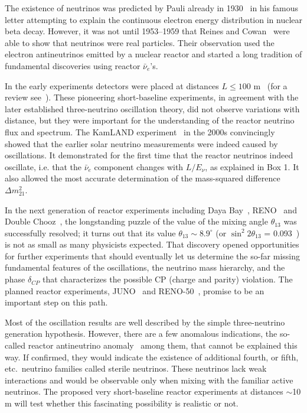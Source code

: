 \documentclass[aps,twocolumn,preprintnumbers,amsmath,superscriptaddress,amssymb,floats,nofootinbib]{revtex4-1}
\begin{document}
The existence of neutrinos was predicted by Pauli already in 1930~\cite{Pauli30} in his famous letter attempting to explain the continuous electron energy 
distribution in nuclear beta decay. 
However, it was not until 1953--1959 that Reines and Cowan~\cite{Reines53,Cowan56,Reines59} were able to show that neutrinos were real particles. 
Their observation used the electron antineutrinos emitted by a nuclear reactor and started a long tradition of fundamental discoveries using reactor $\bar{\nu}_e$'s.

In the early experiments detectors were placed at distances $L \le 100$ m~\cite{ILL,Gosgen,Rovno,Krasnoyarsk,SRP,Bugey4,Bugey3} (for a review see~\cite{Bemporad02}). 
These pioneering short-baseline experiments, in agreement with the later established three-neutrino oscillation theory, did not observe variations with distance,  
but they were important for the understanding of the reactor neutrino flux and spectrum.
The KamLAND experiment~\cite{Kamland03,Kamland05,Kamland08} in the 2000s convincingly showed that the earlier solar neutrino measurements were indeed caused by oscillations. 
It demonstrated for the first time that the reactor neutrinos indeed oscillate, i.e. that the $\bar{\nu}_e$ component changes with $L/E_{\nu}$, as explained in Box 1.
It also allowed the most accurate determination of the mass-squared difference $\Delta m^2_{21}$.  

In the next generation of reactor experiments including Daya Bay~\cite{Dayabay,Dayabay14}, RENO~\cite{Reno}  and Double Chooz~\cite{DChooz,DChooz14}, the longstanding puzzle of the
value of the mixing angle $\theta_{13}$ was successfully resolved; it turns out that its value $\theta_{13} \sim 8.9^\circ$ (or $\sin^2 2\theta_{13}$ = 0.093~\cite{PDG14})
is not as small as many physicists expected. That discovery opened opportunities for further experiments that should eventually 
let us determine the so-far missing fundamental features of the oscillations, the neutrino mass hierarchy, and the phase $\delta_{CP}$ that characterizes the possible CP (charge and parity) violation. 
The planned reactor experiments, JUNO~\cite{He-Now2014} and RENO-50~\cite{RENO-50}, promise to be an important step on this path.

Most of the oscillation results are well described by the simple three-neutrino generation hypothesis. However, there are a few anomalous indications,
the so-called reactor antineutrino anomaly~\cite{Mention} among them, that cannot be explained this way. If confirmed, they would indicate the existence of additional
fourth, or fifth, etc.~neutrino families called sterile neutrinos. 
These neutrinos lack weak interactions and would be observable only when mixing with the familiar active neutrinos.  
The proposed very short-baseline reactor experiments at distances $\sim$10 m will test whether this fascinating possibility is realistic or not.
\end{document}

